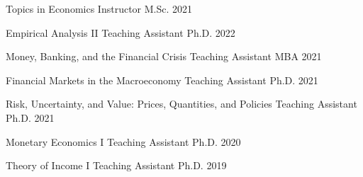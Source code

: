 
\begin{cvhonors}
  \cvhonor
  {Topics in Economics} %
  {Instructor} %
  {M.Sc.} %
  {2021} %

  \cvhonor
  {Empirical Analysis II} %
  {Teaching Assistant} %
  {Ph.D.} %
  {2022} %

  \cvhonor
  {Money, Banking, and the Financial Crisis} %
  {Teaching Assistant} %
  {MBA} %
  {2021} %

  \cvhonor
  {Financial Markets in the Macroeconomy} %
  {Teaching Assistant} %
  {Ph.D.} %
  {2021} %

  \cvhonor
  {Risk, Uncertainty, and Value: Prices, Quantities, and Policies} %
  {Teaching Assistant} %
  {Ph.D.} %
  {2021} %

  \cvhonor
  {Monetary Economics I} %
  {Teaching Assistant} %
  {Ph.D.} %
  {2020} %

  \cvhonor
  {Theory of Income I} %
  {Teaching Assistant} %
  {Ph.D.} %
  {2019} %

\end{cvhonors}

